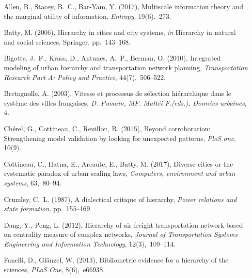 \documentclass[11pt]{article}
\begin{document}
%
%


\begin{thebibliography}{xx}

Allen, B., Stacey, B.~C., Bar-Yam, Y. (2017), Multiscale information theory and
  the marginal utility of information, {\em Entropy}, 19(6),~273.

Batty, M. (2006), Hierarchy in cities and city systems, {\em in} Hierarchy in
  natural and social sciences, Springer, pp.~143--168.

Bigotte, J.~F., Krass, D., Antunes, A.~P., Berman, O. (2010), Integrated
  modeling of urban hierarchy and transportation network planning, {\em
  Transportation Research Part A: Policy and Practice}, 44(7),~506--522.

Bretagnolle, A. (2003), Vitesse et processus de s{\'e}lection hi{\'e}rarchique
  dans le syst{\`e}me des villes fran{\c{c}}aises, {\em D. Pumain, MF.
  Matt{\'e}i F.(eds.), Donn{\'e}es urbaines}, 4.

Ch{\'e}rel, G., Cottineau, C., Reuillon, R. (2015), Beyond corroboration:
  Strengthening model validation by looking for unexpected patterns, {\em PloS
  one}, 10(9).

Cottineau, C., Hatna, E., Arcaute, E., Batty, M. (2017), Diverse cities or the
  systematic paradox of urban scaling laws, {\em Computers, environment and
  urban systems}, 63,~80--94.

Crumley, C.~L. (1987), A dialectical critique of hierarchy, {\em Power
  relations and state formation}, pp.~155--169.

Dang, Y., Peng, L. (2012), Hierarchy of air freight transportation network
  based on centrality measure of complex networks, {\em Journal of
  Transportation Systems Engineering and Information Technology},
  12(3),~109--114.

Fanelli, D., Gl{\"a}nzel, W. (2013), Bibliometric evidence for a hierarchy of
  the sciences, {\em PLoS One}, 8(6),~e66938.


\end{thebibliography}
\end{document}
